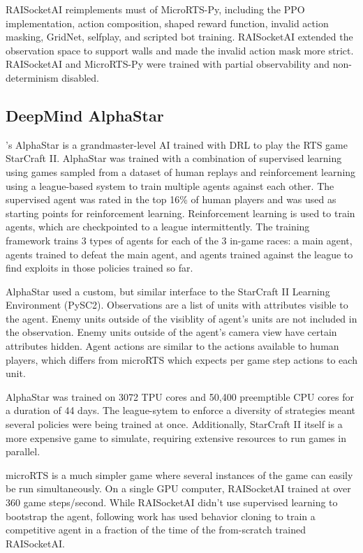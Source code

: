 \documentclass{article}
\begin{document}
RAISocketAI reimplements must of MicroRTS-Py, including the PPO implementation, action
composition, shaped reward function, invalid action masking, GridNet, selfplay, and
scripted bot training. RAISocketAI extended the observation space to support walls and
made the invalid action mask more strict. RAISocketAI and MicroRTS-Py were trained with partial
observability and non-determinism disabled.

\subsection{DeepMind AlphaStar}
\citet{Vinyals2019GrandmasterLI}'s AlphaStar is a grandmaster-level AI trained with DRL to play the RTS game
StarCraft II. AlphaStar was trained with a combination of supervised learning using
games sampled from a dataset of human replays and reinforcement learning using a
league-based system to train multiple agents against each other. The supervised agent
was rated in the top 16\% of human players and was used as starting points for
reinforcement learning. Reinforcement learning is used to train agents, which are
checkpointed to a league intermittently. The training framework trains 3 types of agents
for each of the 3 in-game races: a main agent, agents trained to defeat the main agent, and agents
trained against the league to find exploits in those policies trained so far.

AlphaStar used a custom, but similar interface to the StarCraft II Learning Environment
(PySC2). Observations are a list of units with attributes visible to the agent. Enemy
units outside of the visiblity of agent's units are not included in the observation.
Enemy units outside of the agent's camera view have certain attributes hidden. Agent
actions are similar to the actions available to human players, which differs from
microRTS which expects per game step actions to each unit.

AlphaStar was trained on 3072 TPU cores and 50,400 preemptible CPU cores for a duration of 44 days. The
league-sytem to enforce a diversity of strategies meant several policies were being
trained at once. Additionally, StarCraft II itself is a more expensive game to
simulate, requiring extensive resources to run games in parallel.

microRTS is a much simpler game where several instances of the game can easily be run
simultaneously. On a single GPU computer, RAISocketAI trained at over 360 game
steps/second. While RAISocketAI didn't use supervised learning to bootstrap the agent,
following work has used behavior cloning to train a competitive agent in a fraction of
the time of the from-scratch trained RAISocketAI.
\end{document}
